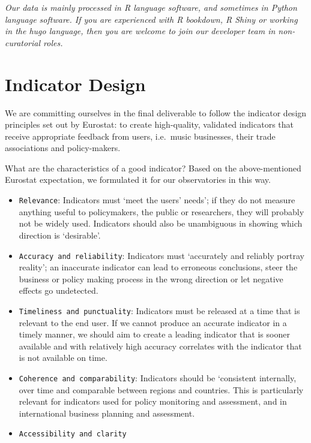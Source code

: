 \documentclass[
  a4paper,
  openany, a4paper, oneside]{book}
\providecommand{\tightlist}{%
  \setlength{\itemsep}{0pt}\setlength{\parskip}{0pt}}
\begin{document}
\emph{Our data is mainly processed in R language software, and sometimes in Python language software. If you are experienced with R bookdown, R Shiny or working in the hugo language, then you are welcome to join our developer team in non-curatorial roles.}

\hypertarget{indicator-design}{%
\section{Indicator Design}\label{indicator-design}}

We are committing ourselves in the final deliverable to follow the indicator design principles set out by Eurostat:
\citep{eurostat_harmonised_indicators_2014, kotzeva_harmonised_indicators_2017, eurostat_harmonised_indicators_2014} to create high-quality, validated indicators that receive appropriate feedback from users, i.e.~music businesses, their trade associations and policy-makers.

What are the characteristics of a good indicator? Based on the above-mentioned Eurostat expectation, we formulated it for our observatories in this way.

\begin{itemize}
\tightlist
\item
  \texttt{Relevance}: Indicators must `meet the users' needs'; if they do not measure anything useful to policymakers, the public or researchers, they will probably not be widely used. Indicators should also be unambiguous in showing which direction is `desirable'.
\item
  \texttt{Accuracy\ and\ reliability}: Indicators must `accurately and reliably portray reality'; an inaccurate indicator can lead to erroneous conclusions, steer the business or policy making process in the wrong direction or let negative effects go undetected.
\item
  \texttt{Timeliness\ and\ punctuality}: Indicators must be released at a time that is relevant to the end user. If we cannot produce an accurate indicator in a timely manner, we should aim to create a leading indicator that is sooner available and with relatively high accuracy correlates with the indicator that is not available on time.
\item
  \texttt{Coherence\ and\ comparability}: Indicators should be `consistent internally, over time and comparable between regions and countries. This is particularly relevant for indicators used for policy monitoring and assessment, and in international business planning and assessment.
\item
  \texttt{Accessibility\ and\ clarity}
\end{itemize}
\end{document}
